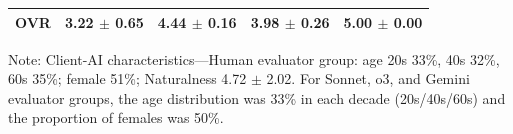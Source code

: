\documentclass{wiley-article}
\begin{document}
\begin{table}[htbp]
\begin{threeparttable}
\begin{tabular}{lrrrr}
      OVR & 3.22 $\pm$ 0.65 & 4.44 $\pm$ 0.16 & 3.98 $\pm$ 0.26 & 5.00 $\pm$ 0.00\\
      \bottomrule
    \end{tabular}
    \begin{tablenotes}
      \footnotesize
      \item Note: Client-AI characteristics—Human evaluator group: age 20s 33\%, 40s 32\%, 60s 35\%; female 51\%; Naturalness 4.72 $\pm$ 2.02. For Sonnet, o3, and Gemini evaluator groups, the age distribution was 33\% in each decade (20s/40s/60s) and the proportion of females was 50\%.
    \end{tablenotes}
  \end{threeparttable}
\end{table}



\clearpage 
\end{document}
